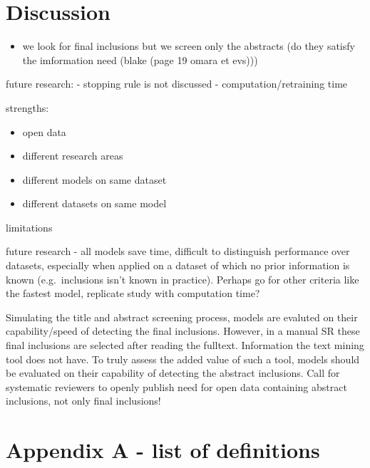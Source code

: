 \documentclass[
]{article}
\providecommand{\tightlist}{%
  \setlength{\itemsep}{0pt}\setlength{\parskip}{0pt}}
\begin{document}
\newpage

\hypertarget{discussion-1}{%
\section{Discussion}\label{discussion-1}}

\begin{itemize}
\tightlist
\item
  we look for final inclusions but we screen only the abstracts (do they
  satisfy the imformation need (blake (page 19 omara et evs)))
\end{itemize}

future research: - stopping rule is not discussed -
computation/retraining time

strengths:

\begin{itemize}
\tightlist
\item
  open data
\item
  different research areas
\item
  different models on same dataset
\item
  different datasets on same model
\end{itemize}

limitations

future research - all models save time, difficult to distinguish
performance over datasets, especially when applied on a dataset of which
no prior information is known (e.g.~inclusions isn't known in practice).
Perhaps go for other criteria like the fastest model, replicate study
with computation time?

Simulating the title and abstract screening process, models are evaluted
on their capability/speed of detecting the final inclusions. However, in
a manual SR these final inclusions are selected after reading the
fulltext. Information the text mining tool does not have. To truly
assess the added value of such a tool, models should be evaluated on
their capability of detecting the abstract inclusions. Call for
systematic reviewers to openly publish need for open data containing
abstract inclusions, not only final inclusions!

\newpage

\hypertarget{appendix-a---list-of-definitions}{%
\section{Appendix A - list of
definitions}\label{appendix-a---list-of-definitions}}
\end{document}
